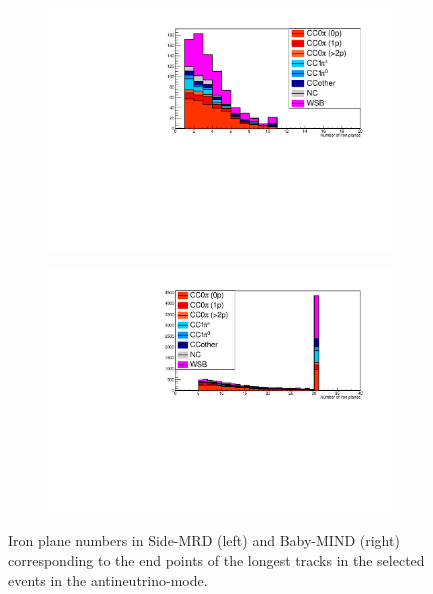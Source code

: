 \begin{figure}[tbh]
  \begin{center}
   \begin{subfigure}{0.48\textwidth}
     \includegraphics[width=0.8\linewidth, angle=270]{fig/RHCMuonPenetration_SideMRD_StoppedOrThroughGoing.pdf}
    \end{subfigure}
  \begin{subfigure}{0.48\textwidth}
      \includegraphics[width=0.8\linewidth, angle=270]{fig/RHCMuonPenetration_DownstreamMRD_StoppedOrThroughGoing.pdf}
    \end{subfigure}    
    \end{center}
  \caption{
Iron plane numbers in Side-MRD (left) and Baby-MIND (right) corresponding to the end points of the longest tracks in the selected events in the antineutrino-mode.
}
\label{fig:endpoint_longest_track_antineutrino}
\end{figure}


